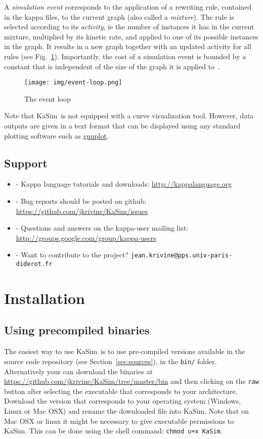 \documentclass[11pt]{book}
\def\KaSim{\textsf{KaSim}}
\def\ttt#1{\texttt{#1}}
\def\ie{ie }
\def\ITE#1{\begin{itemize}#1\end{itemize}}
\begin{document}
A \emph{simulation event} corresponds to the application of a rewriting rule, contained in the kappa files, to the current graph (also called a \emph{mixture}). The rule is selected according to its \emph{activity}, \ie the number of instances it has in the current mixture, multiplied by its kinetic rate, and applied to one of its possible instances in the graph. It results in a new graph together with an updated activity for all rules (see Fig.~\ref{fig:event-loop}). Importantly, the cost of a simulation event is bounded by a constant that is independent of the size of the graph it is applied to~\cite{Dan_etal07b}. 

\begin{figure}[htbp]
\begin{center}
\texttt{[image: img/event-loop.png]}
\caption{The event loop}
\label{fig:event-loop}
\end{center}
\end{figure}

Note that \KaSim~is not equipped with a curve visualization tool. However, data outputs are given in a text format that can be displayed using any standard plotting software such as \href{http://www.gnuplot.info/}{gnuplot}.

\section{Support}
\ITE{
\item[-] Kappa language tutorials and downloads: \url{http://kappalanguage.org}
\item[-] Bug reports should be posted on github: \url{https://github.com/jkrivine/KaSim/issues}
\item[-] Questions and answers on the kappa-user mailing list: \url{http://groups.google.com/group/kappa-users}
\item[-] Want to contribute to the project? \ttt{jean.krivine@pps.univ-paris-diderot.fr}
}

\chapter{Installation}\label{chap:install}

\section{Using precompiled binaries}
The easiest way to use \KaSim~is to use pre-compiled versions available in the source code repository (see Section~\ref{sec:sources}), in the \texttt{bin/} folder. Alternatively your can download the binaries at \url{https://github.com/jkrivine/KaSim/tree/master/bin} and then clicking on the \texttt{raw} button after selecting the executable that corresponds to your architecture. Download the version that corresponds to your operating system (Windows, Linux or Mac OSX) and rename the downloaded file into \KaSim. Note that on Mac OSX or linux it might be necessary to give executable permissions to \KaSim. This can be done using the shell command:  
\ttt{chmod u+x KaSim}. 
\end{document}
